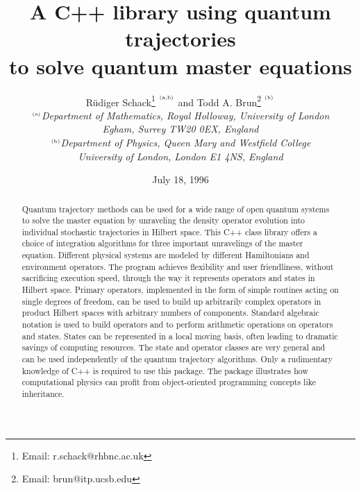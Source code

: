
\setlength{\textheight}{247mm}   %
\setlength{\textwidth}{160mm}    %
\setlength{\topmargin}{0mm}
\setlength{\headheight}{0mm}
\setlength{\headsep}{0mm}
\setlength{\evensidemargin}{0mm}
\setlength{\oddsidemargin}{0mm}
\setlength{\footskip}{8mm}

\def\d{^\dagger}
\def\bra#1{\langle #1 |}
\def\ket#1{| #1 \rangle}
\def\expect#1{\langle #1 \rangle}
\def\Tr{{\rm Tr}}



\title{A C++ library using quantum trajectories \\
to solve quantum master equations}

\author{R\"udiger
  Schack\thanks{Email: r.schack@rhbnc.ac.uk} $^{^{\hbox{\tiny(a,b)}}}$ 
and Todd A. Brun\thanks{Email: brun@itp.ucsb.edu} $^{^{\hbox{\tiny(b)}}}$   
    \vspace{3mm}\\
$^{\hbox{\tiny(a)}}${\it Department of Mathematics, 
             Royal Holloway, University of London} \\
             {\it Egham, Surrey TW20 0EX, England}  \vspace{3mm}\\
$^{\hbox{\tiny(b)}}${\it Department of Physics, 
             Queen Mary and Westfield College} \\
             {\it University of London, London  E1 4NS, England}}

\date{July 18, 1996}
\maketitle

\begin{abstract}
Quantum trajectory methods can be used for a wide range of open quantum systems
to solve the master equation by unraveling the density operator evolution into
individual stochastic trajectories in Hilbert space.  This C++ class library
offers a choice of integration algorithms for three important unravelings of
the master equation. Different physical systems are modeled by different
Hamiltonians and environment operators. The program achieves flexibility and
user friendliness, without sacrificing execution speed, through the way it
represents operators and states in Hilbert space. Primary operators,
implemented in the form of simple routines acting on single degrees of freedom,
can be used to build up arbitrarily complex operators in product Hilbert spaces
with arbitrary numbers of components. Standard algebraic notation is used to
build operators and to perform arithmetic operations on operators and states.
States can be represented in a local moving basis, often leading to dramatic
savings of computing resources. The state and operator classes are very general
and can be used independently of the quantum trajectory algorithms. Only a
rudimentary knowledge of C++ is required to use this package.
The package illustrates how computational physics can profit from 
object-oriented programming concepts like inheritance.
\end{abstract}

